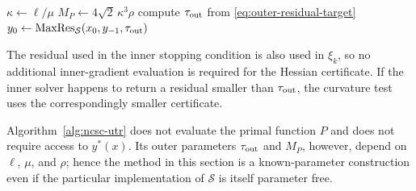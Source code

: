 \begin{algorithm}[t]
\DontPrintSemicolon
\caption{Known-parameter NC--SC UTR with Newton-corrected derivatives}
\label{alg:ncsc-utr}
$\kappa\leftarrow\ell/\mu$\;
$M_P\leftarrow4\sqrt2\,\kappa^3\rho$\;
compute $\tau_{\rm out}$ from \eqref{eq:outer-residual-target}\;
$y_0\leftarrow
\operatorname{MaxRes}_{\mathcal S}
(x_0,y_{-1},\tau_{\rm out})$\;
\end{algorithm}

The residual used in the inner stopping condition is also used in
$\xi_k$, so no additional inner-gradient evaluation is required for
the Hessian certificate. If the inner solver happens to return a
residual smaller than $\tau_{\rm out}$, the curvature test uses the
correspondingly smaller certificate.

Algorithm~\ref{alg:ncsc-utr} does not evaluate the primal function
$P$ and does not require access to $y^*(x)$. Its outer parameters
$\tau_{\rm out}$ and $M_P$, however, depend on
$\ell$, $\mu$, and $\rho$; hence the method in this section is a
known-parameter construction even if the particular implementation of
$\mathcal S$ is itself parameter free.

